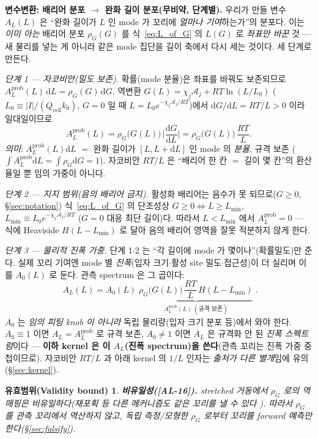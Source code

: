 \documentclass[11pt,a4paper]{article}
\newtheorem*{boundbox}{유효범위(Validity bound)}
\newcommand{\dd}{\mathrm{d}}
\newcommand{\cell}{\mathrm{cell}}
\newcommand{\AL}[1]{\textsf{[AL-#1]}}
\begin{document}
\textbf{변수변환: 배리어 분포 $\to$ 완화 길이 분포(무비약, 단계별).} 우리가 만들 변수 $A_L(L)$ 은 ``완화 길이가
$L$ 인 mode 가 꼬리에 \emph{얼마나 기여}하는가''의 분포다. 이는 \emph{이미 아는} 배리어 분포 $\rho_G(G)$ 를
식~\eqref{eq:L_of_G} 의 $L(G)$ 로 \emph{좌표만 바꾼} 것 — 새 물리를 넣는 게 아니라 같은 mode 집단을 길이 축에서
다시 세는 것이다. 세 단계로 만든다.

\emph{단계 1 — 자코비안(밀도 보존).} 확률(mode 분율)은 좌표를 바꿔도 보존되므로 $A_L^{\mathrm{prob}}(L)\,\dd L
=\rho_G(G)\,\dd G$. 역변환 $G(L)=\chi_j\mathcal A_j+RT\ln(L/L_0)$ ($L_0\equiv|I|/(Q_\cell k_0)$, $G=0$ 일 때
$L=L_0 e^{-\chi_j\mathcal A_j/RT}$)에서 $\dd G/\dd L=RT/L>0$ 이라 일대일이므로
\begin{equation}
A_L^{\mathrm{prob}}(L)=\rho_G\big(G(L)\big)\,\Big|\frac{\dd G}{\dd L}\Big|=\rho_G\big(G(L)\big)\,\frac{RT}{L}.
\label{eq:spectrum_prob}
\end{equation}
\emph{의미}: $A_L^{\mathrm{prob}}(L)\dd L$ $=$ 완화 길이가 $[L,L+\dd L]$ 인 mode 의 \emph{분율}, 규격 보존
($\int A_L^{\mathrm{prob}}\dd L=\int\rho_G\dd G=1$). 자코비안 $RT/L$ 은 ``배리어 한 칸 $=$ 길이 몇 칸''의 환산율일
뿐 임의 가중이 아니다.

\emph{단계 2 — 지지 범위(음의 배리어 금지).} 활성화 배리어는 음수가 못 되므로($G\ge0$, \S\ref{sec:notation})
식~\eqref{eq:L_of_G} 의 단조성상 $G\ge0\Leftrightarrow L\ge L_{\min}$, $L_{\min}\equiv L_0 e^{-\chi_j\mathcal A_j/RT}$
($G=0$ 대응 최단 길이)다. 따라서 $L<L_{\min}$ 에서 $A_L^{\mathrm{prob}}=0$ — 식에 Heaviside $H(L-L_{\min})$ 로
달아 음의 배리어 영역을 잘못 적분하지 않게 한다.

\emph{단계 3 — 물리적 진폭 가중.} 단계 1$\cdot$2 는 ``각 길이에 mode 가 몇이나''(확률밀도)만 준다. 실제 꼬리 기여엔
mode 별 \emph{진폭}(입자 크기$\cdot$활성 site 밀도$\cdot$접근성)이 더 실리며 이를 $A_0(L)$ 로 둔다. 관측 spectrum 은
그 곱이다:
\begin{equation}
\boxed{\;A_L(L)=A_0(L)\;\underbrace{\rho_G\big(G(L)\big)\,\frac{RT}{L}\,H(L-L_{\min})}_{\displaystyle A_L^{\mathrm{prob}}(L)\ (\text{규격 보존})}\;.}
\label{eq:spectrum}
\end{equation}
$A_0$ 는 \emph{임의 피팅 knob 이 아니라} 독립 물리량(입자 크기 분포 등)에서 와야 한다. $A_0\equiv1$ 이면
$A_L=A_L^{\mathrm{prob}}$ 로 규격 보존, $A_0\ne1$ 이면 $A_L$ 은 규격화 안 된 \emph{진폭 스펙트럼}이다 — \textbf{이하
kernel 은 이 $A_L$(진폭 spectrum)을 쓴다}(관측 꼬리는 진폭 가중 중첩이므로). 자코비안 $RT/L$ 과 아래 kernel 의
$1/L$ 인자는 \emph{출처가 다른 별개}임에 유의(\S\ref{sec:kernel}).
\begin{boundbox}
\textbf{비유일성(\AL{16}).} stretched 거동에서 $\rho_G$ 로의 역매핑은 \emph{비유일}하다(재포획 등 다른
메커니즘도 같은 꼬리를 낼 수 있다 \cite{baessler1993}). 따라서 $\rho_G$ 를 관측 꼬리에서 \emph{역산하지
않고}, 독립 측정/모형한 $\rho_G$ 로부터 꼬리를 \emph{forward 예측}만 한다(\S\ref{sec:falsify}).
\end{boundbox}
\end{document}
